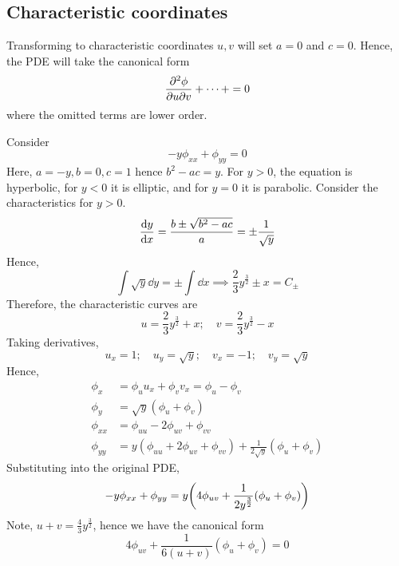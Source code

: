 \subsection{Characteristic coordinates}
Transforming to characteristic coordinates \( u,v \) will set \( a = 0 \) and \( c = 0 \).
Hence, the PDE will take the canonical form
\[
	\pdv{\phi}{u}{v} + \dots + = 0
\]
where the omitted terms are lower order.
\begin{example}
	Consider
	\[
		-y \phi_{xx} + \phi_{yy} = 0
	\]
	Here, \( a = -y, b = 0, c = 1 \) hence \( b^2 - ac = y \).
	For \( y > 0 \), the equation is hyperbolic, for \( y < 0 \) it is elliptic, and for \( y = 0 \) it is parabolic.
	Consider the characteristics for \( y > 0 \).
	\[
		\dv{y}{x} = \frac{b \pm \sqrt{b^2 - ac}}{a} = \pm \frac{1}{\sqrt{y}}
	\]
	Hence,
	\[
		\int \sqrt{y} \dd{y} = \pm \int \dd{x} \implies \frac{2}{3} y^{\frac{3}{2}} \pm x = C_\pm
	\]
	Therefore, the characteristic curves are
	\[
		u = \frac{2}{3} y^{\frac{3}{2}} + x;\quad v = \frac{2}{3} y^{\frac{3}{2}} - x
	\]
	Taking derivatives,
	\[
		u_x = 1;\quad u_y = \sqrt{y};\quad v_x = -1;\quad v_y = \sqrt{y}
	\]
	Hence,
	\begin{align*}
		\phi_x    & = \phi_u u_x + \phi_v v_x = \phi_u - \phi_v                                      \\
		\phi_y    & = \sqrt{y} (\phi_u + \phi_v)                                                     \\
		\phi_{xx} & = \phi_{uu} - 2 \phi_{uv} + \phi_{vv}                                            \\
		\phi_{yy} & = y (\phi_{uu} + 2 \phi_{uv} + \phi_{vv}) + \frac{1}{2\sqrt{y}}(\phi_u + \phi_v)
	\end{align*}
	Substituting into the original PDE,
	\[
		-y \phi_{xx} + \phi_{yy} = y\qty(4 \phi_{uv} + \frac{1}{2y^{\frac{3}{2}}} (\phi_u + \phi_v) )
	\]
	Note, \( u + v = \frac{4}{3} y^{\frac{3}{2}} \), hence we have the canonical form
	\[
		4 \phi_{uv} + \frac{1}{6(u+v)} (\phi_u + \phi_v) = 0
	\]
\end{example}

